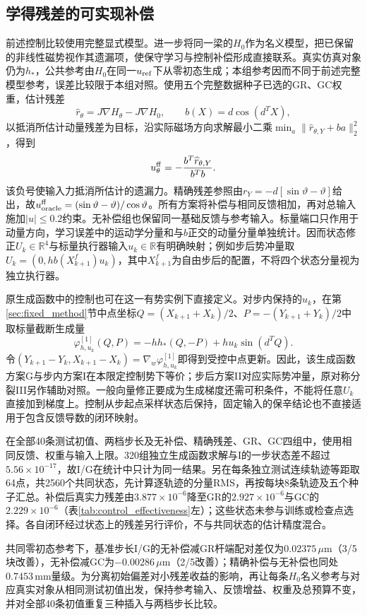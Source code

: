 \subsection{学得残差的可实现补偿}
\label{sec:learned_residual_control}

前述控制比较使用完整显式模型。进一步将同一梁的$H_0$作为名义模型，把已保留的非线性磁势视作其遗漏项，使保守学习与控制补偿形成直接联系。真实仿真对象仍为$h_*$，公共参考由$H_0$在同一$u_{\rm ref}$下从零初态生成；本组参考因而不同于前述完整模型参考，误差比较限于本组对照。使用五个完整数据种子已选的GR、GC权重，估计残差
\[
 \widehat r_\theta=J\nabla H_\theta-J\nabla H_0,
 \qquad b(X)=d\cos(d^TX),
\]
以抵消所估计动量残差为目标，沿实际磁场方向求解最小二乘$\min_a\|\widehat r_{\theta,Y}+b a\|_2^2$，得到
\[
 u_\theta^{\rm ff}=-\frac{b^T\widehat r_{\theta,Y}}{b^Tb}.
\]
该负号使输入力抵消所估计的遗漏力。精确残差参照由$r_Y=-d[\sin\vartheta-\vartheta]$给出，故$u_{\rm oracle}^{\rm ff}=(\sin\vartheta-\vartheta)/\cos\vartheta$。所有方案将补偿与相同反馈相加，再对总输入施加$|u|\leq0.2$约束。无补偿组也保留同一基础反馈与参考输入。标量端口只作用于动量方向，学习误差中的运动学分量和与$b$正交的动量分量单独统计。因而状态修正$U_k\in\mathbb R^4$与标量执行器输入$u_k\in\mathbb R$有明确映射；例如步后势冲量取$U_k=(0,h b(X^f_{k+1})u_k)$，其中$X^f_{k+1}$为自由步后的配置，不将四个状态分量视为独立执行器。

原生成函数中的控制也可在这一有势实例下直接定义。对步内保持的$u_k$，在第\ref{sec:fixed_method}节中点坐标$Q=(X_{k+1}+X_k)/2$、$P=-(Y_{k+1}+Y_k)/2$中取标量截断生成量
\[
 \varphi_{h,u_k}^{[1]}(Q,P)
 =-h h_*(Q,-P)+h u_k\sin(d^TQ).
\]
令$(Y_{k+1}-Y_k,X_{k+1}-X_k)=\nabla_w\varphi_{h,u_k}^{[1]}$即得到受控中点更新。因此，该生成函数方案G与步内方案I在本限定控制势下等价；步后方案II对应实际势冲量，原对称分裂III另作辅助对照。一般向量修正要成为生成梯度还需可积条件，不能将任意$U_k$直接加到梯度上。控制从步起点采样状态后保持，固定输入的保辛结论也不直接适用于包含反馈导数的闭环映射。

在全部40条测试初值、两档步长及无补偿、精确残差、GR、GC四组中，使用相同反馈、权重与输入上限。320组独立生成函数求解与I的一步状态差不超过$5.56\times10^{-17}$，故I/G在统计中只计为同一结果。另在每条独立测试连续轨迹等距取64点，共2560个共同状态，先计算逐轨迹的分量RMS，再按每块8条轨迹及五个种子汇总。补偿后真实力残差由$3.877\times10^{-6}$降至GR的$2.927\times10^{-6}$与GC的$2.229\times10^{-6}$（表\ref{tab:control_effectiveness}左）；这些状态未参与训练或检查点选择。各自闭环经过状态上的残差另行评价，不与共同状态的估计精度混合。

共同零初态参考下，基准步长I/G的无补偿减GR杆端配对差仅为$0.02375\,\mu\mathrm m$（3/5块改善），无补偿减GC为$-0.00286\,\mu\mathrm m$（2/5改善）；精确补偿与无补偿也同处$0.7453\,\mathrm{mm}$量级。为分离初始偏差对小残差收益的影响，再让每条$H_0$名义参考与对应真实对象从相同测试初值出发，保持参考输入、反馈增益、权重及总预算不变，并对全部40条初值重复三种插入与两档步长比较。

